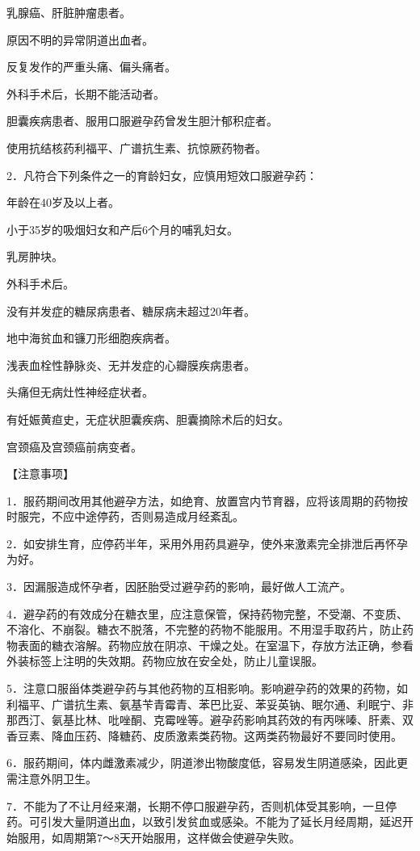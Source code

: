 \documentclass[12pt,UTF8,openany]{ctexbook}
\begin{document}
乳腺癌、肝脏肿瘤患者。

原因不明的异常阴道出血者。

反复发作的严重头痛、偏头痛者。

外科手术后，长期不能活动者。

胆囊疾病患者、服用口服避孕药曾发生胆汁郁积症者。

使用抗结核药利福平、广谱抗生素、抗惊厥药物者。

2．凡符合下列条件之一的育龄妇女，应慎用短效口服避孕药：

年龄在40岁及以上者。

小于35岁的吸烟妇女和产后6个月的哺乳妇女。

乳房肿块。

外科手术后。

没有并发症的糖尿病患者、糖尿病未超过20年者。

地中海贫血和镰刀形细胞疾病者。

浅表血栓性静脉炎、无并发症的心瓣膜疾病患者。

头痛但无病灶性神经症状者。

有妊娠黄疸史，无症状胆囊疾病、胆囊摘除术后的妇女。

宫颈癌及宫颈癌前病变者。

【注意事项】

1．服药期间改用其他避孕方法，如绝育、放置宫内节育器，应将该周期的药物按时服完，不应中途停药，否则易造成月经紊乱。

2．如安排生育，应停药半年，采用外用药具避孕，使外来激素完全排泄后再怀孕为好。

3．因漏服造成怀孕者，因胚胎受过避孕药的影响，最好做人工流产。

4．避孕药的有效成分在糖衣里，应注意保管，保持药物完整，不受潮、不变质、不溶化、不崩裂。糖衣不脱落，不完整的药物不能服用。不用湿手取药片，防止药物表面的糖衣溶解。药物应放在阴凉、干燥之处。在室温下，存放方法正确，参看外装标签上注明的失效期。药物应放在安全处，防止儿童误服。

5．注意口服甾体类避孕药与其他药物的互相影响。影响避孕药的效果的药物，如利福平、广谱抗生素、氨基苄青霉青、苯巴比妥、苯妥英钠、眠尔通、利眠宁、非那西汀、氨基比林、吡唑酮、克霉唑等。避孕药影响其药效的有丙咪嗪、肝素、双香豆素、降血压药、降糖药、皮质激素类药物。这两类药物最好不要同时使用。

6．服药期间，体内雌激素减少，阴道渗出物酸度低，容易发生阴道感染，因此更需注意外阴卫生。

7．不能为了不让月经来潮，长期不停口服避孕药，否则机体受其影响，一旦停药。可引发大量阴道出血，以致引发贫血或感染。不能为了延长月经周期，延迟开始服用，如周期第7～8天开始服用，这样做会使避孕失败。
\end{document}
